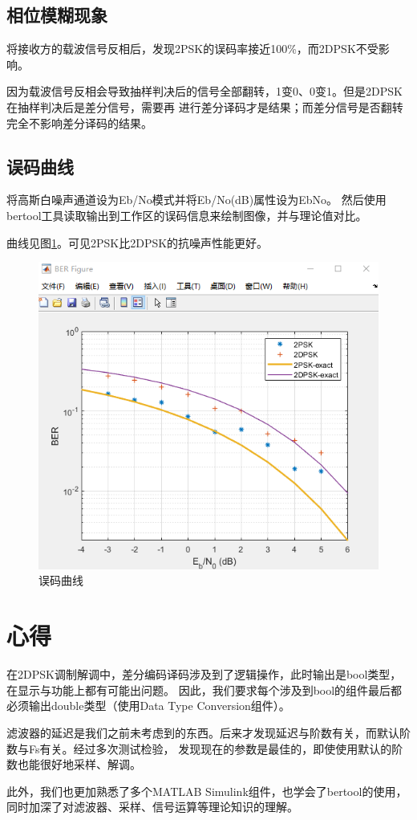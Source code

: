\documentclass[11pt]{paper}
\begin{document}
\subsection{相位模糊现象}

将接收方的载波信号反相后，发现2PSK的误码率接近100\%，而2DPSK不受影响。

因为载波信号反相会导致抽样判决后的信号全部翻转，1变0、0变1。但是2DPSK在抽样判决后是差分信号，需要再
进行差分译码才是结果；而差分信号是否翻转完全不影响差分译码的结果。

\subsection{误码曲线}

将高斯白噪声通道设为Eb/No模式并将Eb/No(dB)属性设为EbNo。
然后使用bertool工具读取输出到工作区的误码信息来绘制图像，并与理论值对比。

曲线见图\ref{误码曲线}。可见2PSK比2DPSK的抗噪声性能更好。

\begin{figure}[H]
    \centering
    \includegraphics[width=5in]{texture/result/误码曲线.png}
    \caption{误码曲线}
    \label{误码曲线}
\end{figure}

\section{心得}

在2DPSK调制解调中，差分编码译码涉及到了逻辑操作，此时输出是bool类型，在显示与功能上都有可能出问题。
因此，我们要求每个涉及到bool的组件最后都必须输出double类型（使用Data Type Conversion组件）。

滤波器的延迟是我们之前未考虑到的东西。后来才发现延迟与阶数有关，而默认阶数与Fs有关。经过多次测试检验，
发现现在的参数是最佳的，即使使用默认的阶数也能很好地采样、解调。

此外，我们也更加熟悉了多个MATLAB Simulink组件，也学会了bertool的使用，
同时加深了对滤波器、采样、信号运算等理论知识的理解。
\end{document}
